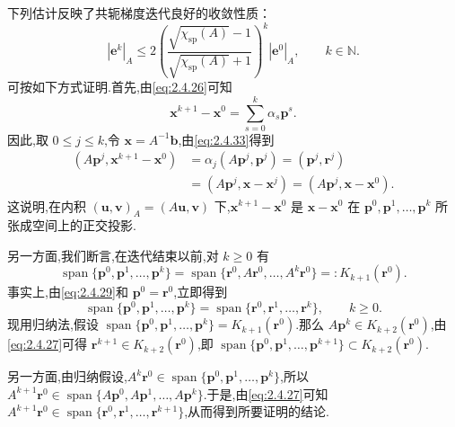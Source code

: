 下列估计反映了共轭梯度迭代良好的收敛性质：
\begin{equation}\label{eq:2.4.34}
  |\boldsymbol{e}^k|_A\le
  2\left(\frac{\sqrt{\chi_{\mathrm{sp}}(A)}-1}
               {\sqrt{\chi_{\mathrm{sp}}(A)}+1}\right)^k|\boldsymbol{e}^0|_A,
  \qquad k\in\mathbb N.
\end{equation}
可按如下方式证明.首先,由\eqref{eq:2.4.26}可知
\[
  \boldsymbol{x}^{k+1}-\boldsymbol{x}^0=\sum_{s=0}^k\alpha_s\boldsymbol{p}^s.
\]
因此,取 \(0\le j\le k\),令 \(\boldsymbol{x}=A^{-1}\boldsymbol{b}\),由\eqref{eq:2.4.33}得到
\[
  \begin{aligned}
    (A\boldsymbol{p}^j,\boldsymbol{x}^{k+1}-\boldsymbol{x}^0)
    &=\alpha_j(A\boldsymbol{p}^j,\boldsymbol{p}^j)=(\boldsymbol{p}^j,\boldsymbol{r}^j)\\
    &=(A\boldsymbol{p}^j,\boldsymbol{x}-\boldsymbol{x}^j)
      =(A\boldsymbol{p}^j,\boldsymbol{x}-\boldsymbol{x}^0).
  \end{aligned}
\]
这说明,在内积 \((\boldsymbol{u},\boldsymbol{v})_A=(A\boldsymbol{u},\boldsymbol{v})\) 下,\(\boldsymbol{x}^{k+1}-\boldsymbol{x}^0\) 是 \(\boldsymbol{x}-\boldsymbol{x}^0\) 在 \(\boldsymbol{p}^0,\boldsymbol{p}^1,\ldots,\boldsymbol{p}^k\) 所张成空间上的正交投影.

另一方面,我们断言,在迭代结束以前,对 \(k\ge0\) 有
\[
  \operatorname{span}\{\boldsymbol{p}^0,\boldsymbol{p}^1,\ldots,\boldsymbol{p}^k\}
  =\operatorname{span}\{\boldsymbol{r}^0,A\boldsymbol{r}^0,\ldots,A^k\boldsymbol{r}^0\}
  =:K_{k+1}(\boldsymbol{r}^0).
\]
事实上,由\eqref{eq:2.4.29}和 \(\boldsymbol{p}^0=\boldsymbol{r}^0\),立即得到
\[
  \operatorname{span}\{\boldsymbol{p}^0,\boldsymbol{p}^1,\ldots,\boldsymbol{p}^k\}
  =\operatorname{span}\{\boldsymbol{r}^0,\boldsymbol{r}^1,\ldots,\boldsymbol{r}^k\},\qquad k\ge0.
\]
现用归纳法,假设 \(\operatorname{span}\{\boldsymbol{p}^0,\boldsymbol{p}^1,\ldots,\boldsymbol{p}^k\}=K_{k+1}(\boldsymbol{r}^0)\).那么 \(A\boldsymbol{p}^k\in K_{k+2}(\boldsymbol{r}^0)\),由\eqref{eq:2.4.27}可得 \(\boldsymbol{r}^{k+1}\in K_{k+2}(\boldsymbol{r}^0)\),即 \(\operatorname{span}\{\boldsymbol{p}^0,\boldsymbol{p}^1,\ldots,\boldsymbol{p}^{k+1}\}\subset K_{k+2}(\boldsymbol{r}^0)\).

另一方面,由归纳假设,\(A^k\boldsymbol{r}^0\in\operatorname{span}\{\boldsymbol{p}^0,\boldsymbol{p}^1,\ldots,\boldsymbol{p}^k\}\),所以 \(A^{k+1}\boldsymbol{r}^0\in\operatorname{span}\{A\boldsymbol{p}^0,A\boldsymbol{p}^1,\ldots,A\boldsymbol{p}^k\}\).于是,由\eqref{eq:2.4.27}可知 \(A^{k+1}\boldsymbol{r}^0\in\operatorname{span}\{\boldsymbol{r}^0,\boldsymbol{r}^1,\ldots,\boldsymbol{r}^{k+1}\}\),从而得到所要证明的结论.

